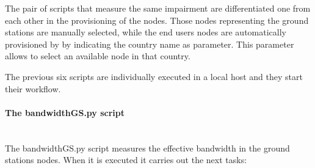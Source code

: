 The pair of scripts that measure the same impairment are differentiated one from each other in the provisioning of the nodes. Those nodes representing the ground stations are manually selected, while the end users nodes are automatically provisioned by \nepi by indicating the country name as parameter. This parameter allows \nepi to select an available node in that country.

The previous six scripts are individually executed in a local host and they start their workflow.

\paragraph{The bandwidthGS.py script}~\\

The bandwidthGS.py  script measures the effective bandwidth in the ground
stations nodes. When it is executed it carries out the next tasks:
